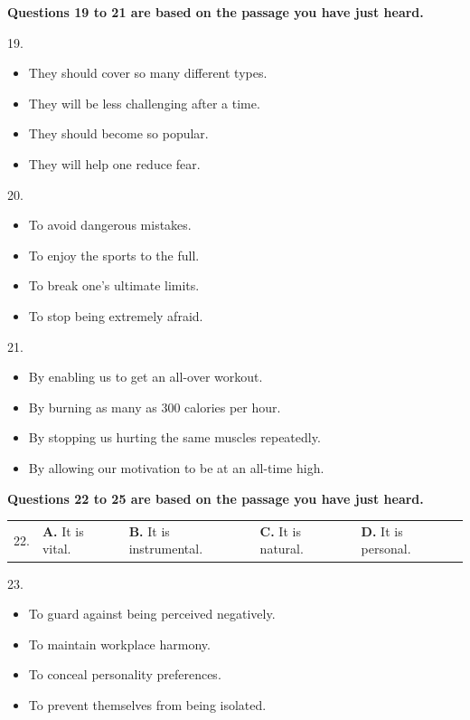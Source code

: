 \documentclass[UTF8,11pt]{ctexart}
\begin{document}
\textbf{Questions 19 to 21 are based on the passage you have just heard.}


19.


\begin{itemize}[leftmargin=2em,itemsep=.2em,topsep=.4em]\item[A.] They should cover so many different types.
\item[B.] They will be less challenging after a time.
\item[C.] They should become so popular.
\item[D.] They will help one reduce fear.
\end{itemize}

20.


\begin{itemize}[leftmargin=2em,itemsep=.2em,topsep=.4em]\item[A.] To avoid dangerous mistakes.
\item[B.] To enjoy the sports to the full.
\item[C.] To break one’s ultimate limits.
\item[D.] To stop being extremely afraid.
\end{itemize}

21.


\begin{itemize}[leftmargin=2em,itemsep=.2em,topsep=.4em]\item[A.] By enabling us to get an all-over workout.
\item[B.] By burning as many as 300 calories per hour.
\item[C.] By stopping us hurting the same muscles repeatedly.
\item[D.] By allowing our motivation to be at an all-time high.
\end{itemize}

\textbf{Questions 22 to 25 are based on the passage you have just heard.}


\noindent\begin{tabularx}{\linewidth}{@{}lXXXX@{}}22. & \textbf{A.} It is vital. & \textbf{B.} It is instrumental. & \textbf{C.} It is natural. & \textbf{D.} It is personal.\\\end{tabularx}\par

23.


\begin{itemize}[leftmargin=2em,itemsep=.2em,topsep=.4em]\item[A.] To guard against being perceived negatively.
\item[B.] To maintain workplace harmony.
\item[C.] To conceal personality preferences.
\item[D.] To prevent themselves from being isolated.
\end{itemize}
\end{document}
